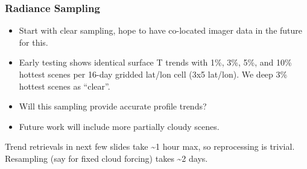 \documentclass[10pt,t]{beamer}
\begin{document}
\begin{frame}
\frametitle{Radiance Sampling}  
\begin{itemize}
\item Start with clear sampling, hope to have co-located imager data in the future for this.
\item Early testing shows identical surface T trends with 1\%, 3\%, 5\%, and 10\% hottest scenes per 16-day gridded lat/lon cell (3x5 lat/lon).  We deep 3\% hottest scenes as ``clear''.
\item Will this sampling provide accurate profile trends?
\item Future work will include more partially cloudy scenes.  
\vspace{0.1in}
\end{itemize}

Trend retrievals in next few slides take \textasciitilde{}1 hour max, so reprocessing is trivial.\\
  \vspace{0.1in}
Resampling (say for fixed cloud forcing) takes \textasciitilde{}2 days.  
\end{frame}
\end{document}
